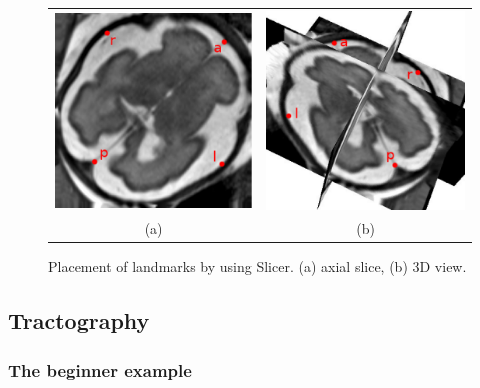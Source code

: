 \begin{figure}[t]
\centering
\begin{tabular}{cc}
\includegraphics[width=0.35\columnwidth]{lmks_axial.eps}&
\includegraphics[width=0.35\columnwidth]{lmks_3D.eps}\\
{(a)}&{(b)}\\
\end{tabular}
\caption{Placement of landmarks by using Slicer. (a) axial slice, (b) 3D view.}
\label{fig:landmarks}
\end{figure}

\subsection{Tractography}
    \subsubsection*{The beginner example}
        

